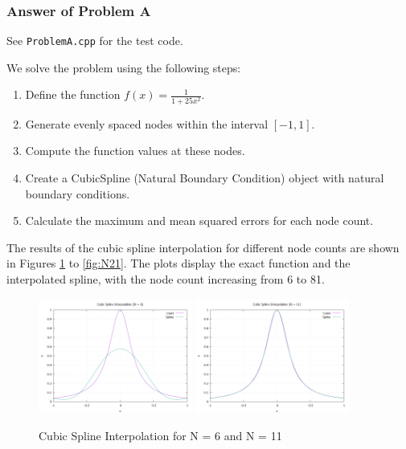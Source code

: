 \documentclass{article}
\begin{document}
\subsubsection{Answer of Problem A}
See \texttt{ProblemA.cpp} for the test code.\par
We solve the problem using the following steps:
\begin{enumerate}
    \item Define the function $f(x) = \frac{1}{1 + 25x^2}$.
    \item Generate evenly spaced nodes within the interval \([-1, 1]\).
    \item Compute the function values at these nodes.
    \item Create a CubicSpline (Natural Boundary Condition) object with natural boundary conditions.
    \item Calculate the maximum and mean squared errors for each node count.
\end{enumerate}
The results of the cubic spline interpolation for different node counts are shown in Figures \ref{fig:N6} to \ref{fig:N21}. The plots display the exact function and the interpolated spline, with the node count increasing from 6 to 81.

\begin{figure}[H]
    \centering
    \includegraphics[width=0.45\textwidth]{../figure/cubic_spline_plot_N6.png}
    \includegraphics[width=0.45\textwidth]{../figure/cubic_spline_plot_N11.png}
    \caption{Cubic Spline Interpolation for N = 6 and N = 11}
    \label{fig:N6}
\end{figure}
\end{document}
